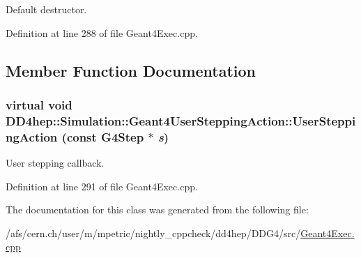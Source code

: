 Default destructor. 

Definition at line 288 of file Geant4Exec.cpp.

\subsection{Member Function Documentation}
\hypertarget{class_d_d4hep_1_1_simulation_1_1_geant4_user_stepping_action_a459952dec8bab794c933b464471d7b60}{
\subsubsection[{UserSteppingAction}]{\setlength{\rightskip}{0pt plus 5cm}virtual void DD4hep::Simulation::Geant4UserSteppingAction::UserSteppingAction (const G4Step $\ast$ {\em s})}}
\label{class_d_d4hep_1_1_simulation_1_1_geant4_user_stepping_action_a459952dec8bab794c933b464471d7b60}


User stepping callback. 

Definition at line 291 of file Geant4Exec.cpp.

The documentation for this class was generated from the following file:\begin{DoxyCompactItemize}
\item 
/afs/cern.ch/user/m/mpetric/nightly\_\-cppcheck/dd4hep/DDG4/src/\hyperlink{_geant4_exec_8cpp}{Geant4Exec.cpp}\end{DoxyCompactItemize}
